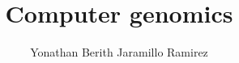 \documentclass[12pt,letterpaper]{article}
\author{Yonathan Berith Jaramillo Ramirez}
\begin{document}
\title{Computer genomics}
\maketitle



\end{document}
